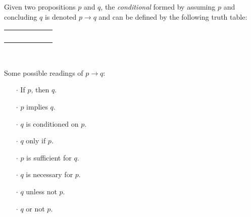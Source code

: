 \begin{definition}
    \begin{center}
        \begin{minipage}[t]{.55\linewidth}
            Given two propositions \(p\) and \(q\),
            the \emph{conditional} formed by assuming \(p\) and concluding \(q\)
            is denoted \(p \rightarrow q\) and can be defined by the following truth table:
            \begin{table}[H]
                \centering
                \label{tab:implies}
                \begin{tabular}{|CcCc||Cc|} \hline
                     &  &  \\ \hline
                    \thead{\(\top\)} & \thead{\(\top\)} &  \\
                    \thead{\(\top\)} & \thead{\(\bot\)} &  \\
                    \thead{\(\bot\)} & \thead{\(\top\)} &  \\
                    \thead{\(\bot\)} & \thead{\(\bot\)} &  \\ \hline
                \end{tabular}
            \end{table}
        \end{minipage}%
        \begin{minipage}[t]{.05\linewidth}
            ~
        \end{minipage}%
        \begin{minipage}[t]{.4\linewidth}
            Some possible readings of \(p \rightarrow q\):\\
            \begin{itemize}
                \item[\(\cdot\)]
                    If \(p\), then \(q\).
                \item[\(\cdot\)]
                    \(p\) implies \(q\).
                \item[\(\cdot\)]
                    \(q\) is conditioned on \(p\).
                \item[\(\cdot\)]
                    \(q\) only if \(p\).
                \item[\(\cdot\)]
                    \(p\) is sufficient for \(q\).
                \item[\(\cdot\)]
                    \(q\) is necessary for \(p\).
                \item[\(\cdot\)]
                    \(q\) unless not \(p\).
                \item[\(\cdot\)]
                    \(q\) or not \(p\).
            \end{itemize}
        \end{minipage}
    \end{center}
\end{definition}

